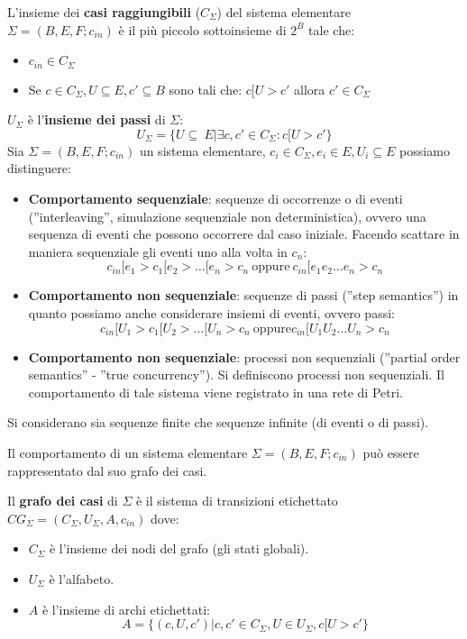 L'insieme dei \textbf{casi raggiungibili} ($C_{\Sigma}$) del sistema elementare $\Sigma = (B, E, F; c_{in})$ è il più piccolo sottoinsieme di $2^B$ tale che:
\begin{itemize}
    \item $c_{in} \in C_{\Sigma}$
    \item Se $c \in C_{\Sigma}, U \subseteq E, c' \subseteq B$ sono tali che: $c[U > c'$ allora $c' \in C_{\Sigma}$ 
\end{itemize}
$U_{\Sigma}$ è l'\textbf{insieme dei passi} di $\Sigma$: 
\begin{equation}
    U_{\Sigma} = \{U \subseteq \ E | \exists c, c' \in C_{\Sigma}: c[U > c'\}
\end{equation}
Sia $\Sigma = (B, E, F; c_{in})$ un sistema elementare, $c_i \in C_{\Sigma}, e_i \in E, U_i \subseteq E$ possiamo distinguere:
\begin{itemize}
    \item \textbf{Comportamento sequenziale}: sequenze di occorrenze o di eventi (”interleaving”, simulazione sequenziale non deterministica), ovvero una sequenza di eventi che possono occorrere dal caso iniziale. Facendo scattare in maniera sequenziale gli eventi uno alla volta in $c_n$:
    \begin{equation}
        c_{in}[e_1 > c_1[e_2 > \dots [e_n > c_n \ \text{oppure} \ c_{in}[e_1e_2 \dots e_n > c_n
    \end{equation}
    \item \textbf{Comportamento non sequenziale}: sequenze di passi (”step semantics”) in quanto possiamo anche considerare insiemi di eventi, ovvero passi:
    \begin{equation}
        c_{in}[U_1 > c_1[U_2 > \dots [U_n > c_n \ \text{oppure} c_{in}[U_1U_2 \dots U_n > c_n
    \end{equation}
    \item \textbf{Comportamento non sequenziale}: processi non sequenziali (”partial order semantics” - ”true concurrency”). Si definiscono processi non sequenziali. Il comportamento di tale sistema viene registrato in una rete di Petri.
\end{itemize}
Si considerano sia sequenze finite che sequenze infinite (di eventi o di passi).

Il comportamento di un sistema elementare $\Sigma = (B, E, F; c_{in})$ può essere rappresentato dal suo grafo dei casi.

Il \textbf{grafo dei casi} di $\Sigma$ è il sistema di transizioni etichettato $CG_{\Sigma} = (C_{\Sigma},U_{\Sigma}, A, c_{in})$ dove:
\begin{itemize}
    \item $C_{\Sigma}$ è l'insieme dei nodi del grafo (gli stati globali).
    \item $U_{\Sigma}$ è l'alfabeto.
    \item $A$ è l'insieme di archi etichettati:
    \begin{equation}
        A = \{(c, U, c') | c, c' \in C_{\Sigma}, U \in U_{\Sigma}, c[U > c'\}
    \end{equation}
\end{itemize}
